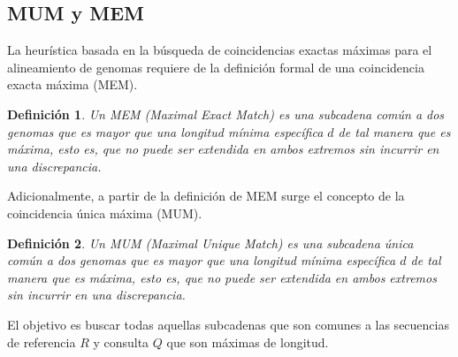 \documentclass[12pt,a4paper]{article}
\newtheorem{mydef}{Definición}
\begin{document}
\subsection{MUM y MEM} 
\indent
La heurística basada en la búsqueda de coincidencias exactas máximas para el alineamiento de genomas requiere de la definición formal de una coincidencia exacta máxima (MEM).\\
\begin{mydef}
  Un MEM (Maximal Exact Match) es una subcadena común a dos
  genomas que es mayor que una longitud mínima específica $d$ de tal manera
  que es máxima, esto es, que no puede ser extendida en ambos extremos sin
  incurrir en una discrepancia. 
\end{mydef}
\indent
Adicionalmente, a partir de la definición de MEM surge el concepto de la coincidencia única máxima (MUM).\\
\begin{mydef}Un MUM (Maximal Unique Match) es una subcadena única común a dos genomas que es mayor que una longitud mínima específica $d$ de tal manera que es máxima, esto es, que no puede ser extendida en ambos extremos sin incurrir en una discrepancia.
\end{mydef}
\indent
El objetivo es buscar todas aquellas subcadenas que son comunes a las secuencias de referencia $R$ y consulta $Q$ que son máximas de longitud.\\
\end{document}
